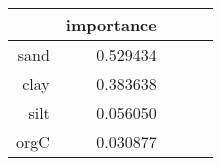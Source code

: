 \begin{tabular}{rrrrr}
\toprule
 & importance \\
\midrule
sand & 0.529434 \\
clay & 0.383638 \\
silt & 0.056050 \\
orgC & 0.030877 \\
\bottomrule
\end{tabular}
